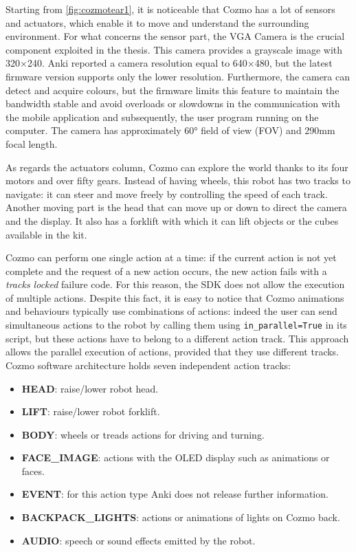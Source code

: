 Starting from \vref{fig:cozmotear1}, it is noticeable that Cozmo has a lot of sensors and actuators, which enable it to move and understand the surrounding environment. For what concerns the sensor part, the VGA Camera is the crucial component exploited in the thesis. This camera provides a grayscale image with 320$\times$240. Anki reported a camera resolution equal to 640$\times$480, but the latest firmware version supports only the lower resolution. Furthermore, the camera can detect and acquire colours, but the firmware limits this feature to maintain the bandwidth stable and avoid overloads or slowdowns in the communication with the mobile application and subsequently, the user program running on the computer.
The camera has approximately 60° field of view (FOV) and 290mm focal length.

As regards the actuators column, Cozmo can explore the world thanks to its four motors and over fifty gears. Instead of having wheels, this robot has two tracks to navigate: it can steer and move freely by controlling the speed of each track.
Another moving part is the head that can move up or down to direct the camera and the display. It also has a forklift with which it can lift objects or the cubes available in the kit.

Cozmo can perform one single action at a time: if the current action is not yet complete and the request of a new action occurs, the new action fails with a \textit{tracks locked} failure code. For this reason, the SDK does not allow the execution of multiple actions. Despite this fact, it is easy to notice that Cozmo animations and behaviours typically use combinations of actions: indeed the user can send simultaneous actions to the robot by calling them using \texttt{in\_parallel=True} in its script, but these actions have to belong to a different action track. This approach allows the parallel execution of actions, provided that they use different tracks.
Cozmo software architecture holds seven independent action tracks:

\begin{itemize}
	\item \textbf{HEAD}: raise/lower robot head.
	\item \textbf{LIFT}: raise/lower robot forklift.
	\item \textbf{BODY}: wheels or treads actions for driving and turning.
	\item \textbf{FACE\_IMAGE}: actions with the OLED display such as animations or faces.
	\item \textbf{EVENT}: for this action type Anki does not release further information.
	\item \textbf{BACKPACK\_LIGHTS}: actions or animations of lights on Cozmo back.
	\item \textbf{AUDIO}: speech or sound effects emitted by the robot.
\end{itemize}

